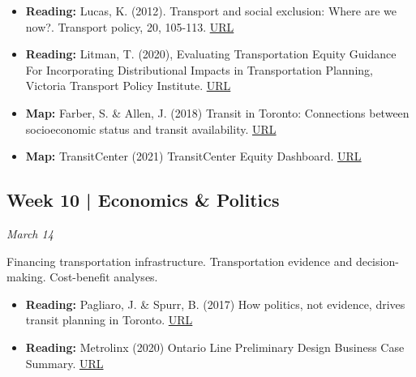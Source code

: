 \documentclass[11pt]{article}
\begin{document}
	\begin{itemize}
		\item \textbf{Reading:} Lucas, K. (2012). Transport and social exclusion: Where are we now?. Transport policy, 20, 105-113. \href{https://doi.org/10.1016/j.tranpol.2012.01.013}{URL}
		
		\item \textbf{Reading:} Litman, T. (2020), Evaluating Transportation Equity Guidance For Incorporating Distributional Impacts in Transportation Planning, Victoria Transport Policy Institute. \href{https://vtpi.org/equity.pdf}{URL}
		
		\item \textbf{Map:} Farber, S. \& Allen, J. (2018) Transit in Toronto: Connections between socioeconomic status and transit availability.  \href{http://edu.maps.arcgis.com/apps/Cascade/index.html?appid=58618c037f344aaaada20b0c894e011c}{URL}
		
		\item \textbf{Map:} TransitCenter (2021) TransitCenter Equity Dashboard. \href{https://dashboard.transitcenter.org/}{URL}
	\end{itemize}
	
	
	
	
	
	\subsection*{Week 10 | Economics \& Politics}
	
	\textit{March 14}
	
	Financing transportation infrastructure. Transportation evidence and decision-making. Cost-benefit analyses. 
	
	\begin{itemize}
		
		\item \textbf{Reading:} Pagliaro, J. \& Spurr, B. (2017) How politics, not evidence, drives transit planning in Toronto. \href{https://www.thestar.com/news/city_hall/2017/09/18/how-politics-not-evidence-drives-transit-planning-in-toronto.html}{URL}
		
		\item \textbf{Reading:} Metrolinx (2020) Ontario Line Preliminary Design 
		Business Case Summary.
		\href{https://www.metrolinx.com/en/regionalplanning/projectevaluation/benefitscases/benefits_case_analyses.aspx}{URL}
		
		
	\end{itemize}
	
\end{document}

